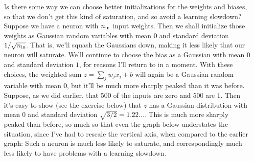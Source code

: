 Is there some way we can choose better initializations for the weights and biases, so that we don't get this kind of saturation, and so avoid a learning slowdown? Suppose we have a neuron with $n_{\rm in}$ input weights. Then we shall initialize those weights as Gaussian random variables with mean $0$ and standard deviation $1/\sqrt{n_{\rm in}}$. That is, we'll squash the Gaussians down, making it less likely that our neuron will saturate. We'll continue to choose the bias as a Gaussian with mean $0$ and standard deviation $1$, for reasons I'll return to in a moment. With these choices, the weighted sum $z = \sum_j w_j x_j + b$ will again be a Gaussian random variable with mean $0$, but it'll be much more sharply peaked than it was before. Suppose, as we did earlier, that $500$ of the inputs are zero and $500$ are $1$. Then it's easy to show (see the exercise below) that $z$ has a Gaussian distribution with mean $0$ and standard deviation $\sqrt{3/2} = 1.22\ldots$. This is much more sharply peaked than before, so much so that even the graph below understates the situation, since I've had to rescale the vertical axis, when compared to the earlier graph: Such a neuron is much less likely to saturate, and correspondingly much less likely to have problems with a learning slowdown.



